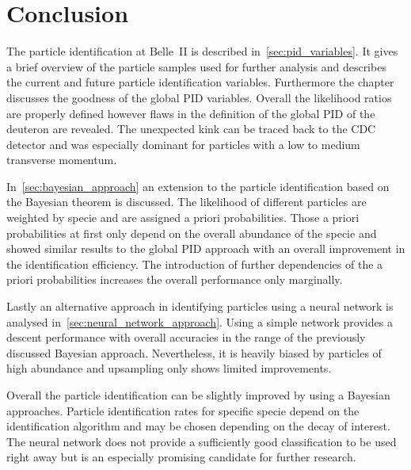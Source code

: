 \chapter{Conclusion}
\label{chap:conclusion}

The particle identification at Belle~\RN{2} is described in~\autoref{sec:pid_variables}. It gives a brief overview of the particle samples used for further analysis and describes the current and future particle identification variables. Furthermore the chapter discusses the goodness of the global PID variables. Overall the likelihood ratios are properly defined however flaws in the definition of the global PID of the deuteron are revealed. The unexpected kink can be traced back to the CDC detector and was especially dominant for particles with a low to medium transverse momentum.

In~\autoref{sec:bayesian_approach} an extension to the particle identification based on the Bayesian theorem is discussed. The likelihood of different particles are weighted by specie and are assigned a priori probabilities. Those a priori probabilities at first only depend on the overall abundance of the specie and showed similar results to the global PID approach with an overall improvement in the identification efficiency. The introduction of further dependencies of the a priori probabilities increases the overall performance only marginally.

Lastly an alternative approach in identifying particles using a neural network is analysed in~\autoref{sec:neural_network_approach}. Using a simple network provides a descent performance with overall accuracies in the range of the previously discussed Bayesian approach. Nevertheless, it is heavily biased by particles of high abundance and upsampling only shows limited improvements.

Overall the particle identification can be slightly improved by using a Bayesian approaches. Particle identification rates for specific specie depend on the identification algorithm and may be chosen depending on the decay of interest. The neural network does not provide a sufficiently good classification to be used right away but is an especially promising candidate for further research.
